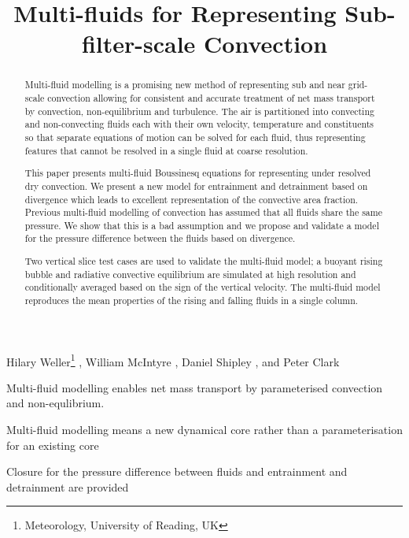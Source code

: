 \documentclass[draft]{agujournal2019}
\begin{document}
\title{Multi-fluids for Representing Sub-filter-scale Convection}

\authors
{
    Hilary Weller\thanks{Meteorology, University of Reading, UK}
    ,
    William McIntyre
    ,
    Daniel Shipley
    , and 
    Peter Clark
}



\begin{keypoints}
\item Multi-fluid modelling enables net mass transport by parameterised convection and non-equlibrium.
\item Multi-fluid modelling means a new dynamical core rather than a parameterisation for an existing core
\item Closure for the pressure difference between fluids and entrainment and detrainment are provided
\end{keypoints}

\begin{abstract}
Multi-fluid modelling is a promising new method of representing sub
and near grid-scale convection allowing for consistent and accurate
treatment of net mass transport by convection, non-equilibrium and
turbulence. The air is partitioned into convecting and non-convecting
fluids each with their own velocity, temperature and constituents
so that separate equations of motion can be solved for each fluid,
thus representing features that cannot be resolved in a single fluid
at coarse resolution. 

This paper presents multi-fluid Boussinesq equations for representing
under resolved dry convection. We present a new model for entrainment
and detrainment based on divergence which leads to excellent representation
of the convective area fraction. Previous multi-fluid modelling of
convection has assumed that all fluids share the same pressure. We
show that this is a bad assumption and we propose and validate a model
for the pressure difference between the fluids based on divergence. 

Two vertical slice test cases are used to validate the multi-fluid
model; a buoyant rising bubble and radiative convective equilibrium
are simulated at high resolution and conditionally averaged based
on the sign of the vertical velocity. The multi-fluid model reproduces
the mean properties of the rising and falling fluids in a single column. 
\end{abstract}
\end{document}
